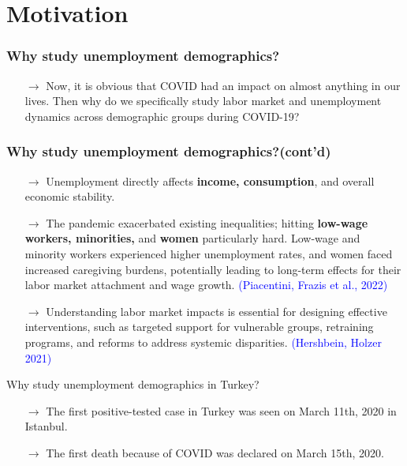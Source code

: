 \documentclass[
	11pt, %
]{beamer}
\begin{document}
\section{Motivation}
\begin{frame}
    \frametitle{Why study unemployment demographics?}
     \begin{itemize}
        \item[$\rightarrow$]  Now, it is obvious that COVID had an impact on almost anything in our lives. Then why do we specifically study labor market and unemployment dynamics across demographic groups during COVID-19?
     
        \end{itemize}
    
      
\end{frame}

\begin{frame}
    \frametitle{Why study unemployment demographics?(cont'd)}
        \begin{itemize}
            \item[$\rightarrow$] \small Unemployment directly affects \textbf{income, consumption}, and overall economic stability.
            
            \item[$\rightarrow$] \small The pandemic exacerbated existing inequalities; hitting \textbf{low-wage workers, minorities,} and \textbf{women} particularly hard. Low-wage and minority workers experienced higher unemployment rates, and women faced increased caregiving burdens, potentially leading to long-term effects for their labor market attachment and wage growth. \textcolor{blue}{(Piacentini, Frazis et al., 2022)}
            
            \item[$\rightarrow$] \small Understanding labor market impacts is essential for designing effective interventions, such as targeted support for vulnerable groups, retraining programs, and reforms to address systemic disparities. \textcolor{blue}{(Hershbein, Holzer 2021)}   
        \end{itemize}
\end{frame}


\begin{frame}{Why study unemployment demographics in Turkey?}
    \begin{itemize}
        \item[$\rightarrow$] The first positive-tested case in Turkey was seen on March 11th, 2020 in Istanbul.
        \item[$\rightarrow$] The first death because of COVID was declared on March 15th, 2020.
        
    \end{itemize}
    
    
\end{frame}
\end{document}
